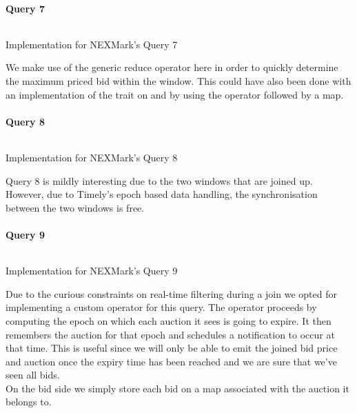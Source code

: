 \paragraph{Query 7}
\begin{listing}[H]
  \inputminted[firstline=680,lastline=686]{rust}{benchmarks/src/nexmark.rs}
  \caption{Implementation for NEXMark's Query 7}
  \label{lst:nexmark-query7}
\end{listing}

We make use of the generic reduce operator here in order to quickly determine the maximum priced bid within the window. This could have also been done with an implementation of the  trait on  and by using the  operator followed by a map.

\paragraph{Query 8}
\begin{listing}[H]
  \inputminted[firstline=719,lastline=728]{rust}{benchmarks/src/nexmark.rs}
  \caption{Implementation for NEXMark's Query 8}
  \label{lst:nexmark-query8}
\end{listing}

Query 8 is mildly interesting due to the two windows that are joined up. However, due to Timely's epoch based data handling, the synchronisation between the two windows is free.

\paragraph{Query 9}\label{sec:query9}
\begin{listing}[H]
  \inputminted[firstline=751,lastline=788]{rust}{benchmarks/src/nexmark.rs}
  \caption{Implementation for NEXMark's Query 9}
  \label{lst:nexmark-query9}
\end{listing}

Due to the curious constraints on real-time filtering during a join we opted for implementing a custom operator for this query. The operator proceeds by computing the epoch on which each auction it sees is going to expire. It then remembers the auction for that epoch and schedules a notification to occur at that time. This is useful since we will only be able to emit the joined bid price and auction once the expiry time has been reached and we are sure that we've seen all bids. \\

On the bid side we simply store each bid on a map associated with the auction it belongs to. \\

